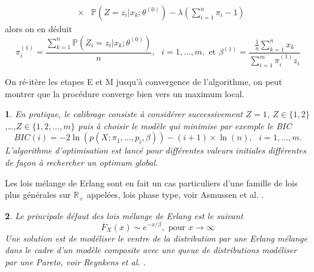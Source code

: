 \documentclass[8pt,notheorems]{beamer}
\def \P {\mathbb P}
\newcommand{\R}{\mathbb{R}}
\newtheorem{remark}{\translate{Remark}}
\theoremstyle{definition}
\newtheorem{definition}{\translate{Definition}}
\theoremstyle{example}
\theoremstyle{mystyle}
\theoremstyle{plain}
\begin{document}
\begin{frame}[allowframebreaks]
\begin{enumerate}
\begin{eqnarray*}
&\times&\P\left(Z=z_i|x_k;\theta^{(0)}\right)-\lambda\left(\sum_{i=1}^{n}\pi_i - 1\right)
\end{eqnarray*}
alors on en déduit
$$
\pi^{(1)}_{i}=\frac{\sum_{k=1}^{n}\P\left(Z_i=z_i|x_k;\theta^{(0)}\right)}{n},\text{ }i =1,\ldots, m,\text{ et }
\beta^{(1)}=\frac{\frac{1}{n}\sum_{k=1}^n x_k}{\sum_{i=1}^{m}\pi_i^{(1)}z_i}
$$
\end{enumerate}
On ré-itère les etapes E et M jusqu'à convergence de l'algorithme, on peut montrer que la procédure converge bien vers un maximum local.
\begin{remark}
En pratique, le calibrage consiste à considérer successivement $Z=1$, $Z\in\{1,2\}$,\ldots,$Z\in\{1,2,\ldots, m\}$ puis à choisir le modèle qui minimise par exemple le BIC
$$
BIC(i) = -2\ln(p(X;\pi_1,\ldots, p_{i},\beta))-(i+1)\times\ln(n),\text{ }i=1,\ldots, m.
$$
L'algorithme d'optimisation est lancé pour différentes valeurs initiales différentes de façon à rechercher un optimum global.
\end{remark}
Les lois mélange de Erlang sont en fait un cas particuliers d'une famille de lois plus générales sur $\R_+$ appelées, lois phase type, voir Asmussen et al. \cite{asmussen1996fitting}.
\begin{remark}
Le principale défaut des lois mélange de Erlang est le suivant
$$
\overline{F}_X(x)\sim e^{-x/\beta},\text{ pour }x\rightarrow \infty
$$
Une solution est de modéliser le ventre de la distribution par une Erlang mélange dans le cadre d'un modèle composite avec une queue de distributions modéliser par une Pareto, voir Reynkens et al. \cite{reynkens2017modelling}.
\end{remark}




\end{frame}
\end{document}
